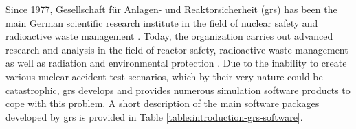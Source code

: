 Since 1977, Gesellschaft für Anlagen- und Reaktorsicherheit (\acrshort{grs}) has been the main German scientific research institute in the field of nuclear safety and radioactive waste management \cite{grs:grs-general-info}. Today, the organization carries out advanced research and analysis in the field of reactor safety, radioactive waste management as well as radiation and environmental protection \cite{grs:grs-general-info}. Due to the inability to create various nuclear accident test scenarios, which by their very nature could be catastrophic, \acrshort{grs} develops and provides numerous simulation software products to cope with this problem. A short description of the main software packages developed by \acrshort{grs} is provided in Table \ref{table:introduction-grs-software}.\\


